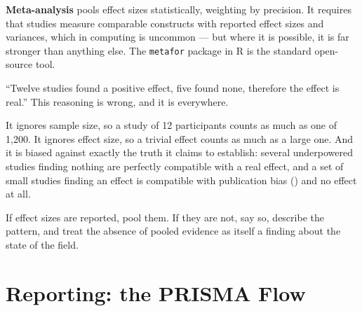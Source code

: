 \textbf{Meta-analysis} pools effect sizes statistically, weighting by precision.
It requires that studies measure comparable constructs with reported effect
sizes and variances, which in computing is uncommon --- but where it is
possible, it is far stronger than anything else. The \texttt{metafor} package
in R is the standard open-source tool.

\begin{pitfall}
``Twelve studies found a positive effect, five found none, therefore the effect
is real.'' This reasoning is wrong, and it is everywhere.

\medskip
It ignores sample size, so a study of 12 participants counts as much as one of
1,200. It ignores effect size, so a trivial effect counts as much as a large
one. And it is biased against exactly the truth it claims to establish: several
underpowered studies finding nothing are perfectly compatible with a real
effect, and a set of small studies finding an effect is compatible with
publication bias () and no effect at all.

\medskip
If effect sizes are reported, pool them. If they are not, say so, describe the
pattern, and treat the absence of pooled evidence as itself a finding about the
state of the field.
\end{pitfall}

\section{Reporting: the PRISMA Flow}

